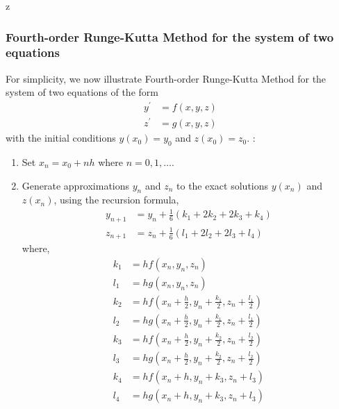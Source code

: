 z\documentclass[a4paper,12pt,twoside]{book}
\newcommand{\nll}[0]{\newline\newline}
\newcommand{\algo}[0]{\boxed{\textbf{\textit{Algorithm}}}}
\renewcommand{\d}[0]{\prime}
\begin{document}
\subsubsection{Fourth-order Runge-Kutta Method for the system of two equations}
For simplicity, we now illustrate Fourth-order Runge-Kutta Method for the system of two equations of the form
\begin{equation}
\begin{split}
    y^\d &= f(x,y,z)\\
    z^\d &= g(x,y,z)
\end{split}
\end{equation}
with the initial conditions $y(x_0) = y_0$ and $z(x_0) = z_0$.
\nll
\algo : 
\begin{enumerate}
    \item {Set $x_n = x_0 + nh$ where $n=0,1,\dots$.}
    \item{Generate approximations $y_n$ and $z_n$ to the exact solutions $y(x_n)$ and $z(x_n)$, using the recursion formula,
    \begin{equation}
        \begin{split}
            y_{n+1} &= y_n + \frac{1}{6}(k_1 + 2k_2 + 2k_3 + k_4)\\
            z_{n+1} &= z_n + \frac{1}{6}(l_1 + 2l_2 + 2l_3 + l_4)
        \end{split}
    \end{equation}
    where,
    \begin{equation}
        \begin{split}
            k_1 &= hf(x_n,y_n,z_n)\\
            l_1 &= hg(x_n,y_n,z_n)\\
            k_2 &= hf\left( x_n + \frac{h}{2},y_n + \frac{k_1}{2},z_n + \frac{l_1}{2} \right)\\
            l_2 &= hg\left(x_n + \frac{h}{2},y_n + \frac{k_1}{2},z_n + \frac{l_1}{2}\right)\\
             k_3 &= hf\left( x_n + \frac{h}{2},y_n + \frac{k_2}{2},z_n + \frac{l_2}{2} \right)\\
            l_3 &= hg\left(x_n + \frac{h}{2},y_n + \frac{k_2}{2},z_n + \frac{l_2}{2}\right)\\
             k_4 &= hf\left( x_n + h,y_n + k_3, z_n + l_3 \right)\\
            l_4 &= hg\left(x_n + h, y_n + k_3, z_n + l_3\right)
        \end{split}
    \end{equation}
    }
\end{enumerate}
\end{document}
